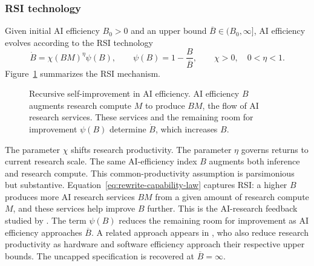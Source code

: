 \subsubsection{RSI technology}
\label{subsubsec:rewrite-capability}

Given initial AI efficiency \(B_0>0\) and an upper bound
\(\overline B\in(B_0,\infty]\), AI efficiency evolves according to the RSI technology
\begin{equation}
 \dot B=\chi(BM)^\eta\psi(B),
 \qquad
 \psi(B)=
  1-\frac{B}{\overline B},
 \qquad \chi>0,\quad0<\eta<1.
 \label{eq:rewrite-capability-law}
\end{equation}
Figure~\ref{fig:rewrite-capability-flow} summarizes the RSI mechanism.
\begin{figure}[H]
 \centering
 \caption{Recursive self-improvement in AI efficiency. AI efficiency $B$ augments
 research compute $M$ to produce $BM$, the flow of AI research services. These services and the remaining
 room for improvement $\psi(B)$ determine \(\dot B\), which increases $B$.}
 \label{fig:rewrite-capability-flow}
\end{figure}
The parameter \(\chi\) shifts research productivity. The parameter \(\eta\) governs returns to current research scale. The same AI-efficiency index $B$ augments both inference and research compute. This common-productivity assumption is parsimonious but substantive. Equation~\eqref{eq:rewrite-capability-law} captures RSI: a higher $B$ produces more AI research services $BM$ from a given amount of research compute $M$, and these services help improve $B$ further. This is the AI-research feedback studied by \citet{davidsonetal2026}. The term \(\psi(B)\) reduces the remaining room for improvement as AI efficiency approaches \(\overline B\). A related approach appears in \citet{erdiletal2025gate}, who also reduce research productivity as hardware and software efficiency approach their respective upper bounds. The uncapped specification is recovered at \(\overline B=\infty\).


